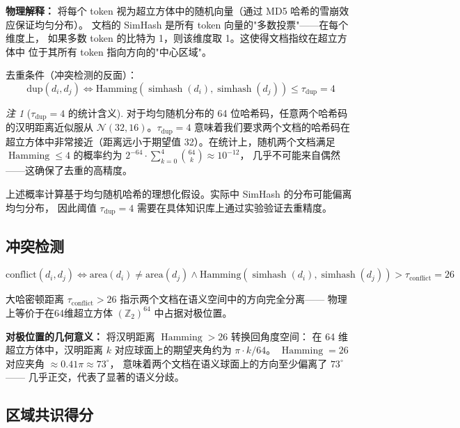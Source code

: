 \documentclass[11pt,a4paper]{ctexart}
\theoremstyle{remark}
\newtheorem{remark}{注}[section]
\DeclareMathOperator{\Ham}{Hamming}
\begin{document}
\textbf{物理解释：} 将每个 token 视为超立方体中的随机向量（通过 MD5 哈希的雪崩效应保证均匀分布）。
文档的 SimHash 是所有 token 向量的"多数投票"——在每个维度上，
如果多数 token 的比特为 1，则该维度取 1。这使得文档指纹在超立方体中
位于其所有 token 指向方向的"中心区域"。

去重条件（冲突检测的反面）：
\begin{equation}
\text{dup}(d_i, d_j) \iff \text{Hamming}(\operatorname{simhash}(d_i), \operatorname{simhash}(d_j)) \leq \tau_{\text{dup}} = 4
\end{equation}

\begin{remark}[$\tau_{\text{dup}} = 4$ 的统计含义]
对于均匀随机分布的 64 位哈希码，任意两个哈希码的汉明距离近似服从
$\mathcal{N}(32, 16)$。$\tau_{\text{dup}} = 4$ 意味着我们要求两个文档的哈希码在
超立方体中非常接近（距离远小于期望值 32）。在统计上，随机两个文档满足
$\Ham \leq 4$ 的概率约为 $2^{-64} \cdot \sum_{k=0}^{4} \binom{64}{k} \approx 10^{-12}$，
几乎不可能来自偶然——这确保了去重的高精度。

上述概率计算基于均匀随机哈希的理想化假设。实际中 SimHash 的分布可能偏离均匀分布，
因此阈值 $\tau_{\text{dup}} = 4$ 需要在具体知识库上通过实验验证去重精度。
\end{remark}

\subsection{冲突检测}

\begin{equation}
\text{conflict}(d_i, d_j) \iff \text{area}(d_i) \neq \text{area}(d_j) \land \text{Hamming}(\operatorname{simhash}(d_i), \operatorname{simhash}(d_j)) > \tau_{\text{conflict}} = 26
\end{equation}

大哈密顿距离 $\tau_{\text{conflict}} > 26$ 指示两个文档在语义空间中的方向完全分离——
物理上等价于在64维超立方体 $(\mathbb{Z}_2)^{64}$ 中占据对极位置。

\textbf{对极位置的几何意义：} 将汉明距离 $\Ham > 26$ 转换回角度空间：
在 64 维超立方体中，汉明距离 $k$ 对应球面上的期望夹角约为 $\pi \cdot k/64$。
$\Ham = 26$ 对应夹角 $\approx 0.41\pi \approx 73^\circ$，
意味着两个文档在语义球面上的方向至少偏离了 $73^\circ$——
几乎正交，代表了显著的语义分歧。

\subsection{区域共识得分}
\end{document}
